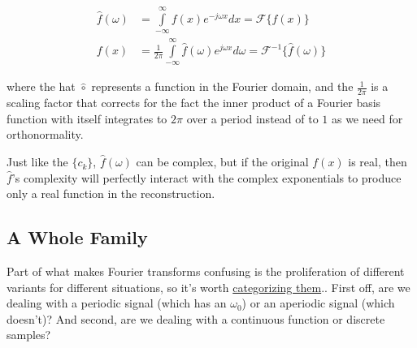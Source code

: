 \documentclass[10pt]{article}
\begin{document}
\begin{equation}\label{pair}
\begin{aligned}
\hat{f}(\omega) &= \int\limits_{-\infty}^{\infty} f(x) e^{-j \omega x} dx = \mathcal{F}\{f(x)\} \\
f(x) &= \frac{1}{2\pi} \int\limits_{-\infty}^{\infty} \hat{f}(\omega) e^{j \omega x} d \omega = \mathcal{F}^{-1}\{\hat{f}(\omega)\}
\end{aligned}
\end{equation}

where the hat $\hat{\circ}$ represents a function in the Fourier domain, and the $\frac{1}{2\pi}$ is a scaling factor that corrects for the fact the inner product of a Fourier basis function with itself integrates to $2\pi$ over a period instead of to $1$ as we need for orthonormality.

Just like the $\{c_k\}$, $\hat{f}(\omega)$ can be complex, but if the original $f(x)$ is real, then $\hat{f}$'s complexity will perfectly interact with the complex exponentials to produce only a real function in the reconstruction.

\subsection{A Whole Family}\label{family}

Part of what makes Fourier transforms confusing is the proliferation of different variants for different situations, so it's worth \href{https://medium.com/sho-jp/fourier-transform-101-part-4-discrete-fourier-transform-8fc3fbb763f3 }{categorizing them}.\cite{medium}. First off, are we dealing with a periodic signal (which has an $\omega_0$) or an aperiodic signal (which doesn't)? And second, are we dealing with a continuous function or discrete samples?
\end{document}
